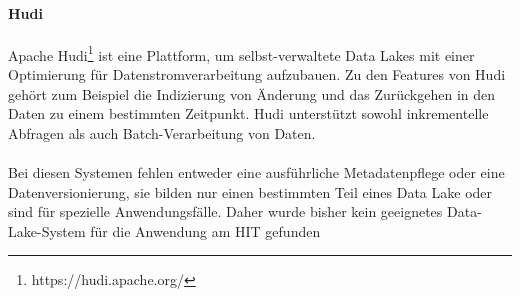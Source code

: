 \paragraph{Hudi} Apache Hudi\footnote{https://hudi.apache.org/} ist eine Plattform, um selbst-verwaltete Data Lakes mit einer Optimierung für Datenstromverarbeitung aufzubauen.
Zu den Features von Hudi gehört zum Beispiel die Indizierung von Änderung und das Zurückgehen in den Daten zu einem bestimmten Zeitpunkt.
Hudi unterstützt sowohl inkrementelle Abfragen als auch Batch-Verarbeitung von Daten.

\paragraph{}
Bei diesen Systemen fehlen entweder eine ausführliche Metadatenpflege oder eine Datenversionierung, sie bilden nur einen bestimmten Teil eines Data Lake oder sind für spezielle Anwendungsfälle.
Daher wurde bisher kein geeignetes Data-Lake-System für die Anwendung am HIT gefunden


